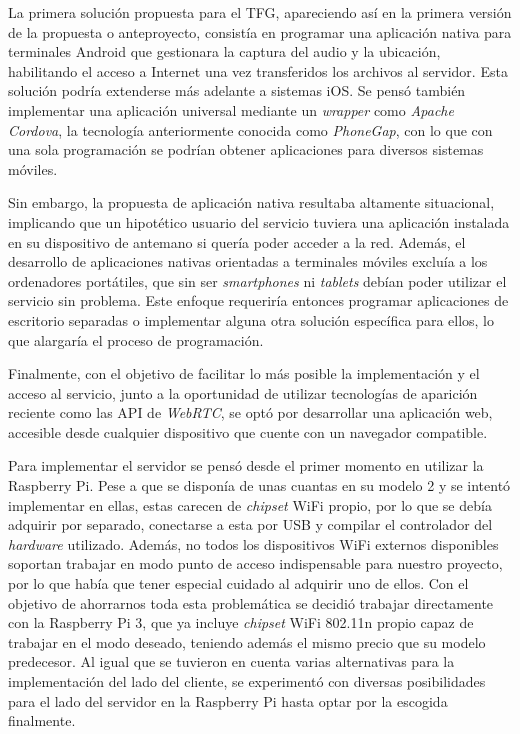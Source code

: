 \begin{appendices}
La primera solución propuesta para el TFG, apareciendo así en la primera versión de la propuesta o anteproyecto, consistía en programar una aplicación nativa para terminales Android que gestionara la captura del audio y la ubicación, habilitando el acceso a Internet una vez transferidos los archivos al servidor. Esta solución podría extenderse más adelante a sistemas iOS. Se pensó también implementar una aplicación universal mediante un \emph{wrapper} como \emph{Apache Cordova}, la tecnología anteriormente conocida como \emph{PhoneGap}, con lo que con una sola programación se podrían obtener aplicaciones para diversos sistemas móviles.

Sin embargo, la propuesta de aplicación nativa resultaba altamente situacional, implicando que un hipotético usuario del servicio tuviera una aplicación instalada en su dispositivo de antemano si quería poder acceder a la red. Además, el desarrollo de aplicaciones nativas orientadas a terminales móviles excluía a los ordenadores portátiles, que sin ser \emph{smartphones} ni \emph{tablets} debían poder utilizar el servicio sin problema. Este enfoque requeriría entonces programar aplicaciones de escritorio separadas o implementar alguna otra solución específica para ellos, lo que alargaría el proceso de programación.

Finalmente, con el objetivo de facilitar lo más posible la implementación y el acceso al servicio, junto a la oportunidad de utilizar tecnologías de aparición reciente como las API de \emph{WebRTC}, se optó por desarrollar una aplicación web, accesible desde cualquier dispositivo que cuente con un navegador compatible.

Para implementar el servidor se pensó desde el primer momento en utilizar la Raspberry Pi. Pese a que se disponía de unas cuantas en su modelo 2 y se intentó implementar en ellas, estas carecen de \emph{chipset} WiFi propio, por lo que se debía adquirir por separado, conectarse a esta por USB y compilar el controlador del \emph{hardware} utilizado. Además, no todos los dispositivos WiFi externos disponibles soportan trabajar en modo punto de acceso indispensable para nuestro proyecto, por lo que había que tener especial cuidado al adquirir uno de ellos. Con el objetivo de ahorrarnos toda esta problemática se decidió trabajar directamente con la Raspberry Pi 3, que ya incluye \emph{chipset} WiFi 802.11n propio capaz de trabajar en el modo deseado, teniendo además el mismo precio que su modelo predecesor. Al igual que se tuvieron en cuenta varias alternativas para la implementación del lado del cliente, se experimentó con diversas posibilidades para el lado del servidor en la Raspberry Pi hasta optar por la escogida finalmente.


\end{appendices}
